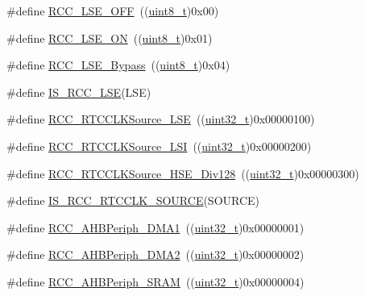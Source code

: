 \begin{DoxyCompactItemize}
\#define \hyperlink{group___l_s_e__configuration_ga6645c27708d0cad1a4ab61d2abb24c77}{R\+C\+C\+\_\+\+L\+S\+E\+\_\+\+O\+FF}~((\hyperlink{_p_e___types_8h_aba7bc1797add20fe3efdf37ced1182c5}{uint8\+\_\+t})0x00)
\item 
\#define \hyperlink{group___l_s_e__configuration_gac981ea636c2f215e4473901e0912f55a}{R\+C\+C\+\_\+\+L\+S\+E\+\_\+\+ON}~((\hyperlink{_p_e___types_8h_aba7bc1797add20fe3efdf37ced1182c5}{uint8\+\_\+t})0x01)
\item 
\#define \hyperlink{group___l_s_e__configuration_gac911af00bffa1bd1b1676f582a8a88e1}{R\+C\+C\+\_\+\+L\+S\+E\+\_\+\+Bypass}~((\hyperlink{_p_e___types_8h_aba7bc1797add20fe3efdf37ced1182c5}{uint8\+\_\+t})0x04)
\item 
\#define \hyperlink{group___l_s_e__configuration_ga95d2678bf8f46e932e7cba75619a4d2c}{I\+S\+\_\+\+R\+C\+C\+\_\+\+L\+SE}(L\+SE)
\item 
\#define \hyperlink{group___r_t_c__clock__source_ga18c0c40ff4289148c9fa44c6848d5552}{R\+C\+C\+\_\+\+R\+T\+C\+C\+L\+K\+Source\+\_\+\+L\+SE}~((\hyperlink{_p_e___types_8h_a33594304e786b158f3fb30289278f5af}{uint32\+\_\+t})0x00000100)
\item 
\#define \hyperlink{group___r_t_c__clock__source_ga7758c87e4584bfa76cb99c726b7162c3}{R\+C\+C\+\_\+\+R\+T\+C\+C\+L\+K\+Source\+\_\+\+L\+SI}~((\hyperlink{_p_e___types_8h_a33594304e786b158f3fb30289278f5af}{uint32\+\_\+t})0x00000200)
\item 
\#define \hyperlink{group___r_t_c__clock__source_gada0bedcd0afa5104ec0ef398d1ac2778}{R\+C\+C\+\_\+\+R\+T\+C\+C\+L\+K\+Source\+\_\+\+H\+S\+E\+\_\+\+Div128}~((\hyperlink{_p_e___types_8h_a33594304e786b158f3fb30289278f5af}{uint32\+\_\+t})0x00000300)
\item 
\#define \hyperlink{group___r_t_c__clock__source_gae76a0340b02b5342e756fa0d2112ebf5}{I\+S\+\_\+\+R\+C\+C\+\_\+\+R\+T\+C\+C\+L\+K\+\_\+\+S\+O\+U\+R\+CE}(S\+O\+U\+R\+CE)
\item 
\#define \hyperlink{group___a_h_b__peripheral_gaf32783f8481c4343726994073918b3ff}{R\+C\+C\+\_\+\+A\+H\+B\+Periph\+\_\+\+D\+M\+A1}~((\hyperlink{_p_e___types_8h_a33594304e786b158f3fb30289278f5af}{uint32\+\_\+t})0x00000001)
\item 
\#define \hyperlink{group___a_h_b__peripheral_ga5afb68e40dc0b0f1aa00466e49bc9e70}{R\+C\+C\+\_\+\+A\+H\+B\+Periph\+\_\+\+D\+M\+A2}~((\hyperlink{_p_e___types_8h_a33594304e786b158f3fb30289278f5af}{uint32\+\_\+t})0x00000002)
\item 
\#define \hyperlink{group___a_h_b__peripheral_ga8aec305b766b1c0ae297f8e1be103bd1}{R\+C\+C\+\_\+\+A\+H\+B\+Periph\+\_\+\+S\+R\+AM}~((\hyperlink{_p_e___types_8h_a33594304e786b158f3fb30289278f5af}{uint32\+\_\+t})0x00000004)

\end{DoxyCompactItemize}
